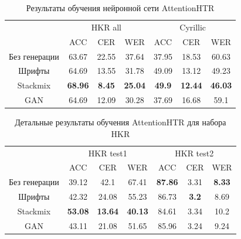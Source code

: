 \begin{table}[h!]
    \centering
    \begin{tabular}{|c|c|c|c|c|c|c|}
        \hline
              & \multicolumn{3}{c|}{HKR all} & \multicolumn{3}{c|}{Cyrillic} \\
        \cline{2-7}
                         &  ACC           &  CER           &  WER           &  ACC           &  CER           &  WER           \\
        \hline
        \hline
        Без генерации    & 63.67          & 22.55          & 37.64          & 37.95          & 18.53          & 60.63          \\
        Шрифты           & 64.69          & 13.55          & 31.78          & 49.09          & 13.12          & 49.23          \\
        Stackmix         & \textbf{68.96} &  \textbf{8.45} & \textbf{25.04} & \textbf{49.9}  & \textbf{12.44} & \textbf{46.03} \\
        GAN              & 64.69          & 12.09          & 30.28          & 37.69          & 16.68          & 59.1           \\
        \hline
    \end{tabular}
    \caption{Результаты обучения нейронной сети AttentionHTR}
    \label{tab:attention_htr_results}
\end{table}

\begin{table}[h!]
    \centering
    \begin{tabular}{|c|c|c|c|c|c|c|}
        \hline
        & \multicolumn{3}{c|}{HKR test1} & \multicolumn{3}{c|}{HKR test2} \\
        \cline{2-7}
                         &  ACC           &  CER           &  WER           &  ACC           &  CER           &  WER           \\
        \hline
        \hline
        Без генерации    & 39.12          & 42.1           & 67.41          & \textbf{87.86} & 3.31           & \textbf{8.33}  \\
        Шрифты           & 42.32          & 24.08          & 55.23          & 86.73          & \textbf{3.2}   & 8.69           \\
        Stackmix         & \textbf{53.08} & \textbf{13.64} & \textbf{40.13} & 84.61          & 3.34           & 10.2           \\
        GAN              & 43.11          & 21.08          & 51.65          & 85.96          & 3.24           & 9.24           \\
        \hline
    \end{tabular}
    \caption{Детальные результаты обучения AttentionHTR для набора HKR}
    \label{tab:attention_htr_results_hkr}
\end{table}


